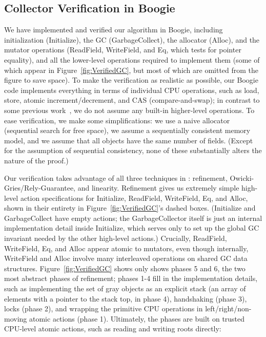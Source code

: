 \subsection{Collector Verification in Boogie}

We have implemented and verified our algorithm in Boogie,
including initialization (Initialize), the GC (GarbageCollect), the allocator (Alloc),
and the mutator operations (ReadField, WriteField, and Eq, which tests for pointer equality),
and all the lower-level operations required to implement them (some of which appear
in Figure~\ref{fig:VerifiedGC}, but most of which are omitted from the figure to save space).
To make the verification as realistic as possible,
our Boogie code implements everything in terms of individual CPU operations,
such as load, store, atomic increment/decrement, and CAS (compare-and-swap);
in contrast to some previous work~\cite{gont96},
we do not assume any built-in higher-level operations.
To ease verification, we make some simplifications:
we use a naive allocator (sequential search for free space),
we assume a sequentially consistent memory model,
and we assume that all objects have the same number of fields.
(Except for the assumption of sequential consistency, none of these substantially alters the nature of the proof.)

Our verification takes advantage of all three techniques in \civl: refinement, Owicki-Gries/Rely-Guarantee, and linearity.
Refinement gives us extremely simple high-level action specifications for Initialize, ReadField, WriteField, Eq, and Alloc,
shown in their entirety in Figure~\ref{fig:VerifiedGC}'s dashed boxes.
(Initialize and GarbageCollect have empty actions; the GarbageCollector itself is just an internal implementation detail inside Initialize,
which serves only to set up the global GC invariant needed by the other high-level actions.)
Crucially, ReadField, WriteField, Eq, and Alloc appear atomic to mutators, even though internally,
WriteField and Alloc involve many interleaved operations on shared GC data structures.
Figure~\ref{fig:VerifiedGC} shows only shows phases 5 and 6, the two most abstract phases of refinement;
phases 1-4 fill in the implementation details,
such as implementing the set of gray objects as an explicit stack (an array of elements with a pointer to the stack top, in phase 4),
handshaking (phase 3), locks (phase 2), and wrapping the primitive CPU operations in left/right/non-moving atomic actions (phase 1).
Ultimately, the phases are built on trusted CPU-level atomic actions, such as reading and writing roots directly:

